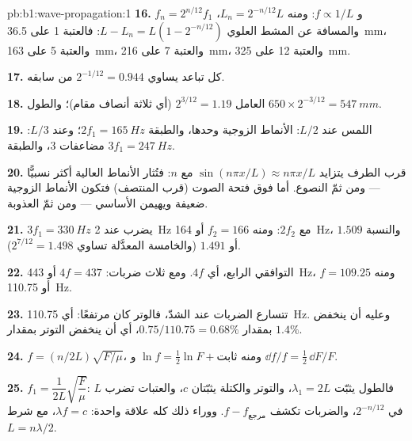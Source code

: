 \begin{solution}{pb:b1:wave-propagation:1}
\textbf{16.} $f_n = 2^{n/12}f_1$ و $f \propto 1/L$: ومنه $L_n = 2^{-n/12}L$،
والمسافة عن المشط العلوي $L - L_n = L(1 - 2^{-n/12})$: فالعتبة 1 على \qty{36.5}{mm}،
والعتبة 5 على \qty{163}{mm}، والعتبة 7 على \qty{216}{mm}، والعتبة 12 على \qty{325}{mm}.

\textbf{17.} كل تباعد يساوي $2^{-1/12} = 0.944$ من سابقه.

\textbf{18.} العامل $2^{3/12} = 1.19$ (أي ثلاثة أنصاف مقام)؛ والطول
$650 \times 2^{-3/12} = \qty{547}{mm}$.

\textbf{19.} اللمس عند $L/2$: الأنماط الزوجية وحدها، والطبقة $2f_1 =
\qty{165}{Hz}$؛ وعند $L/3$: مضاعفات $3$، والطبقة $3f_1 = \qty{247}{Hz}$.

\textbf{20.} قرب الطرف يتزايد $\sin(n\pi x/L) \approx n\pi x/L$ مع
$n$: فتُثار الأنماط العالية أكثر نسبيًّا --- ومن ثمّ النصوع. أما فوق فتحة
الصوت (قرب المنتصف) فتكون الأنماط الزوجية ضعيفة ويهيمن الأساسي
--- ومن ثمّ العذوبة.

\textbf{21.} $3f_1 = \qty{330}{Hz}$ يضرب عند \qty{2}{Hz} مع $2f_2$:
ومنه $f_2 = 166$ أو \qty{164}{Hz}، والنسبة $1.509$ أو $1.491$ (والخامسة
المعدَّلة تساوي $2^{7/12} = 1.498$).

\textbf{22.} التوافقي الرابع، أي $4f$. ومع ثلاث ضربات: $4f = 437$ أو
\qty{443}{Hz}، ومنه $f = 109.25$ أو \qty{110.75}{Hz}.

\textbf{23.} تتسارع الضربات عند الشدّ، فالوتر كان مرتفعًا:
أي \qty{110.75}{Hz}. وعليه أن ينخفض بمقدار $0.75/110.75 = 0.68\%$، أي أن
ينخفض التوتر بمقدار $1.4\%$.

\textbf{24.} $f = (n/2L)\sqrt{F/\mu}$، ومنه $\ln f = \tfrac12\ln F + \text{ثابت}$
و $\dd f/f = \tfrac12\,\dd F/F$.

\textbf{25.} $f_1 = \dfrac{1}{2L}\sqrt{\dfrac{F}{\mu}}$: فالطول يثبّت
$\lambda_1 = 2L$، والتوتر والكتلة يثبّتان $c$، والعتبات تضرب $L$ في
$2^{-n/12}$، والضربات تكشف $f - f_{\text{مرجع}}$. ووراء ذلك كله علاقة
واحدة: $\lambda f = c$، مع شرط  $L = n\lambda/2$.
\end{solution}
